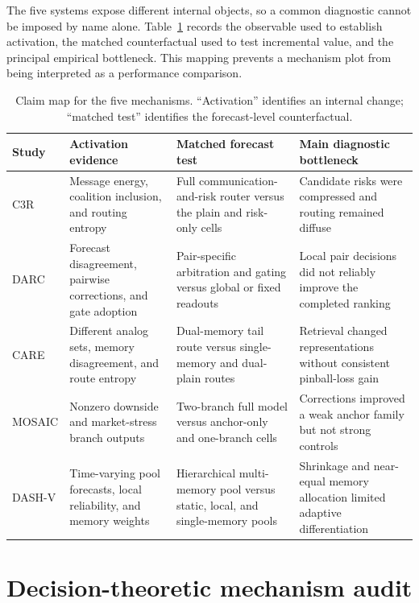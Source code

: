 \documentclass[10pt]{article}
\begin{document}
The five systems expose different internal objects, so a common diagnostic
cannot be imposed by name alone. Table~\ref{tab:claim-register} records the
observable used to establish activation, the matched counterfactual used to
test incremental value, and the principal empirical bottleneck. This mapping
prevents a mechanism plot from being interpreted as a performance comparison.

\begin{table}[H]
\centering
\small
\caption{Claim map for the five mechanisms. ``Activation'' identifies an internal change; ``matched test'' identifies the forecast-level counterfactual.}
\label{tab:claim-register}
\begin{tabular}{p{1.35cm}p{4.0cm}p{4.1cm}p{4.2cm}}
\toprule
Study & Activation evidence & Matched forecast test & Main diagnostic bottleneck \\
\midrule
C3R & Message energy, coalition inclusion, and routing entropy & Full communication-and-risk router versus the plain and risk-only cells & Candidate risks were compressed and routing remained diffuse \\
DARC & Forecast disagreement, pairwise corrections, and gate adoption & Pair-specific arbitration and gating versus global or fixed readouts & Local pair decisions did not reliably improve the completed ranking \\
CARE & Different analog sets, memory disagreement, and route entropy & Dual-memory tail route versus single-memory and dual-plain routes & Retrieval changed representations without consistent pinball-loss gain \\
MOSAIC & Nonzero downside and market-stress branch outputs & Two-branch full model versus anchor-only and one-branch cells & Corrections improved a weak anchor family but not strong controls \\
DASH-V & Time-varying pool forecasts, local reliability, and memory weights & Hierarchical multi-memory pool versus static, local, and single-memory pools & Shrinkage and near-equal memory allocation limited adaptive differentiation \\
\bottomrule
\end{tabular}
\end{table}

\section{Decision-theoretic mechanism audit}
\end{document}
